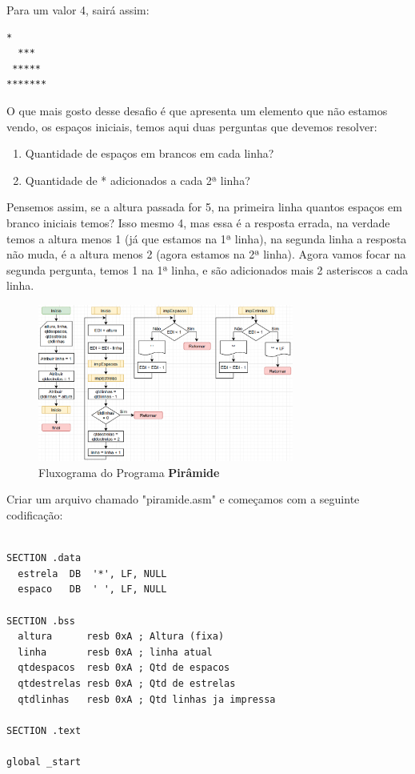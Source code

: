 Para um valor 4, sairá assim:
\begin{lstlisting}[]
   *
  ***
 *****
*******
\end{lstlisting}

O que mais gosto desse desafio é que apresenta um elemento que não estamos vendo, os espaços iniciais, temos aqui duas perguntas que devemos resolver:
\begin{enumerate}[nolistsep]
	\item Quantidade de espaços em brancos em cada linha?
	\item Quantidade de * adicionados a cada 2ª linha?
\end{enumerate}

Pensemos assim, se a altura passada for 5, na primeira linha quantos espaços em branco iniciais temos? Isso mesmo 4, mas essa é a resposta errada, na verdade temos a altura menos 1 (já que estamos na 1ª linha), na segunda linha a resposta não muda, é a altura menos 2 (agora estamos na 2ª linha). Agora vamos focar na segunda pergunta, temos 1 na 1ª linha, e são adicionados mais 2 asteriscos a cada linha.

\begin{figure}[H]
	\centering
	\includegraphics[width=0.75\textwidth]{Pictures/cap03/programa11}
	\caption{Fluxograma do Programa \textbf{Pirâmide}}
\end{figure}

Criar um arquivo chamado "piramide.asm" e começamos com a seguinte codificação:
\begin{lstlisting}[]
%include 'bibliotecaE.inc'

SECTION .data
  estrela  DB  '*', LF, NULL
  espaco   DB  ' ', LF, NULL

SECTION .bss
  altura      resb 0xA ; Altura (fixa)
  linha       resb 0xA ; linha atual
  qtdespacos  resb 0xA ; Qtd de espacos
  qtdestrelas resb 0xA ; Qtd de estrelas
  qtdlinhas   resb 0xA ; Qtd linhas ja impressa

SECTION .text

global _start
\end{lstlisting}

